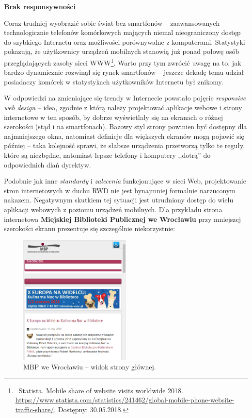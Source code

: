 \documentclass[12pt, a4paper]{article}
\begin{document}
\noindent\textbf{Brak responsywności}\\\vspace{-0.35cm}

Coraz trudniej wyobrazić sobie świat bez smartfonów -- zaawansowanych technologicznie telefonów komórkowych mających niemal nieograniczony dostęp do szybkiego Internetu oraz możliwości porównywalne z komputerami. Statystyki pokazują, że użytkownicy urządzeń mobilnych stanowią już ponad połowę osób przeglądających zasoby sieci WWW\footnote{\ Statista. Mobile share of website visits worldwide 2018. \url{https://www.statista.com/statistics/241462/global-mobile-phone-website-traffic-share/}. Dostępny: 30.05.2018.}. Warto przy tym zwrócić uwagę na to, jak bardzo dynamicznie rozwinął się rynek smartfonów -- jeszcze dekadę temu udział posiadaczy komórek w statystykach użytkowników Internetu był znikomy.

W odpowiedzi na zmieniające się trendy w Internecie powstało pojęcie \textit{responsive web design} -- idea, zgodnie z którą należy projektować aplikacje webowe i strony internetowe w ten sposób, by dobrze wyświetlały się na ekranach o różnej szerokości (stąd i na smartfonach). Bazowy styl strony powinien być dostępny dla najmniejszego okna, natomiast definicje dla większych ekranów mogą pojawić się później -- taka kolejność sprawi, że słabsze urządzenia przetworzą tylko te reguły, które są niezbędne, natomiast lepsze telefony i komputery ,,dotrą'' do odpowiednich dlań dyrektyw.
 
Podobnie jak inne \textit{standardy} i \textit{zalecenia} funkcjonujące w sieci Web, projektowanie stron internetowych w duchu RWD nie jest bynajmniej formalnie narzuconym nakazem. Negatywnym skutkiem tej sytuacji jest utrudniony dostęp do wielu aplikacji webowych z poziomu urządzeń mobilnych. Dla przykładu strona internetowa \textbf{Miejskiej Biblioteki Publicznej we Wrocławiu} przy mniejszej szerokości ekranu prezentuje się szczególnie niekorzystnie:

\begin{figure}[h]
    \centering
    \includegraphics[width=0.5\textwidth]{mbp.png}
    \caption{MBP we Wrocławiu -- widok strony głównej.}
\end{figure}
\end{document}

